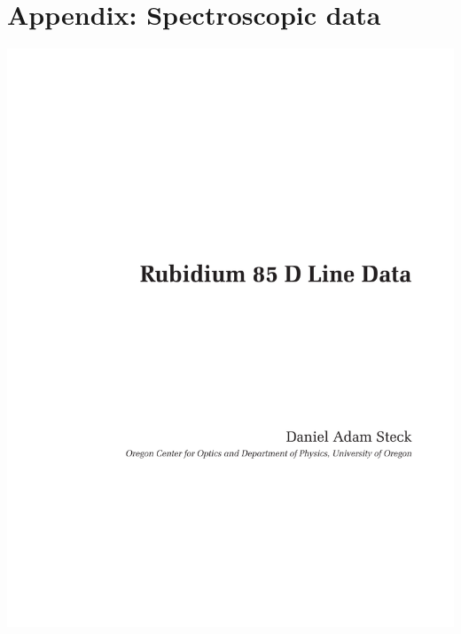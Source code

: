 \documentclass[a4paper, parskip=half, 12pt, bibliography=totocnumbered]{scrartcl}
\begin{document}
\section{Appendix: Spectroscopic data}
\begin{addmargin}[-2em]{2em}
\vspace{-1em}
\includegraphics[page=25, trim=2cm 3cm 2cm 35mm, clip]{literature/rubidium85numbers.pdf}

\end{addmargin}
\end{document}

